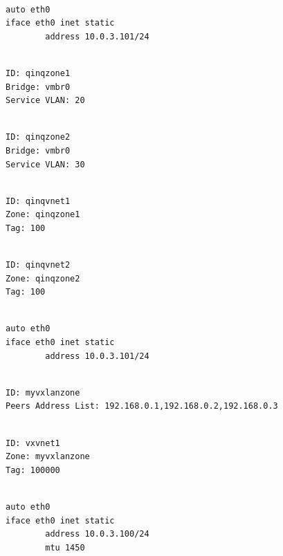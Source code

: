 \begin{lstlisting}

auto eth0
iface eth0 inet static
        address 10.0.3.101/24

\end{lstlisting}

\begin{lstlisting}

ID: qinqzone1
Bridge: vmbr0
Service VLAN: 20

\end{lstlisting}

\begin{lstlisting}

ID: qinqzone2
Bridge: vmbr0
Service VLAN: 30

\end{lstlisting}

\begin{lstlisting}

ID: qinqvnet1
Zone: qinqzone1
Tag: 100

\end{lstlisting}

\begin{lstlisting}

ID: qinqvnet2
Zone: qinqzone2
Tag: 100

\end{lstlisting}

\begin{lstlisting}

auto eth0
iface eth0 inet static
        address 10.0.3.101/24

\end{lstlisting}

\begin{lstlisting}

ID: myvxlanzone
Peers Address List: 192.168.0.1,192.168.0.2,192.168.0.3

\end{lstlisting}

\begin{lstlisting}

ID: vxvnet1
Zone: myvxlanzone
Tag: 100000

\end{lstlisting}

\begin{lstlisting}

auto eth0
iface eth0 inet static
        address 10.0.3.100/24
        mtu 1450

\end{lstlisting}

